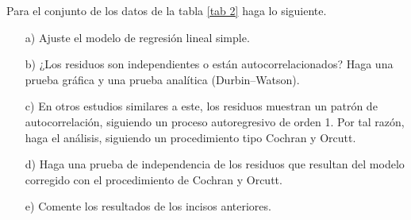 \documentclass[10.5pt,notitlepage]{article}
\theoremstyle{plain}
\begin{document}
\begin{exo}
    Para el conjunto de los datos de la tabla \ref{tab 2} haga lo siguiente.
    \begin{itemize}
        \item[a)] Ajuste el modelo de regresión lineal simple.
        \item[b)] ¿Los residuos son independientes o están autocorrelacionados? Haga una prueba gráfica y una prueba analítica (Durbin--Watson).
        \item[c)] En otros estudios similares a este, los residuos muestran un patrón de autocorrelación, siguiendo un proceso autoregresivo de orden 1. Por tal razón, haga el análisis, siguiendo un procedimiento tipo Cochran y Orcutt.
        \item[d)] Haga una prueba de independencia de los residuos que resultan del modelo corregido con el procedimiento de Cochran y Orcutt.
        \item[e)] Comente los resultados de los incisos anteriores.
    \end{itemize}
\end{exo}
\end{document}
